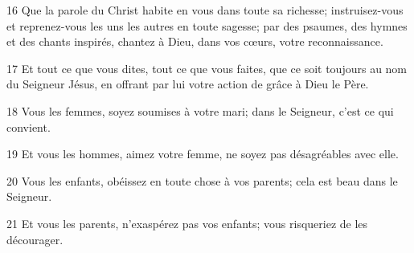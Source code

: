 
16 Que la parole du Christ habite en vous dans toute sa richesse; instruisez-vous et reprenez-vous les uns les autres en toute sagesse; par des psaumes, des hymnes et des chants inspirés, chantez à Dieu, dans vos cœurs, votre reconnaissance.

17 Et tout ce que vous dites, tout ce que vous faites, que ce soit toujours au nom du Seigneur Jésus, en offrant par lui votre action de grâce à Dieu le Père.

18 Vous les femmes, soyez soumises à votre mari; dans le Seigneur, c’est ce qui convient.

19 Et vous les hommes, aimez votre femme, ne soyez pas désagréables avec elle.

20 Vous les enfants, obéissez en toute chose à vos parents; cela est beau dans le Seigneur.

21 Et vous les parents, n’exaspérez pas vos enfants; vous risqueriez de les décourager.

